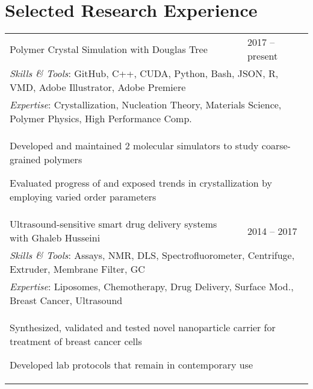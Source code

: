 \documentclass[letterpaper,11pt]{article}
\begin{document}
\section*{Selected Research Experience}
\setlength\extrarowheight{-6pt}
\begin{tabular}{@{}p{}l@{}}
  Polymer Crystal Simulation with Douglas Tree & 2017 -- present \\[6pt]
  \multicolumn{2}{p{\textwidth}}{\textit{Skills \& Tools}: GitHub, C++, CUDA, Python, Bash, JSON, R, VMD, Adobe Illustrator, Adobe Premiere} \\[2pt]
  \multicolumn{2}{p{\textwidth}}{\textit{Expertise}: Crystallization, Nucleation Theory, Materials Science, Polymer Physics, High Performance Comp.} \\
  \multicolumn{2}{p{\textwidth}}{
    \begin{tabitemize} 
      \item Developed and maintained 2 molecular simulators to study coarse-grained polymers
      \item Evaluated progress of and exposed trends in crystallization by employing varied order parameters
    \end{tabitemize}
  }  \\ 
  Ultrasound-sensitive smart drug delivery systems with Ghaleb Husseini & 2014 -- 2017 \\[6pt]
  \multicolumn{2}{p{\textwidth}}{\textit{Skills \& Tools}: Assays, NMR, DLS, Spectrofluorometer, Centrifuge, Extruder, Membrane Filter, GC} \\[2pt]
  \multicolumn{2}{p{\textwidth}}{\textit{Expertise}: Liposomes, Chemotherapy, Drug Delivery, Surface Mod., Breast Cancer, Ultrasound} \\
  \multicolumn{2}{p{\textwidth}}{
    \begin{tabitemize} 
      \item Synthesized, validated and tested novel nanoparticle carrier for treatment of breast cancer cells
      \item Developed lab protocols that remain in contemporary use
    \end{tabitemize}}\\
\end{tabular} \\
\setlength\extrarowheight{1pt}
\end{document}
